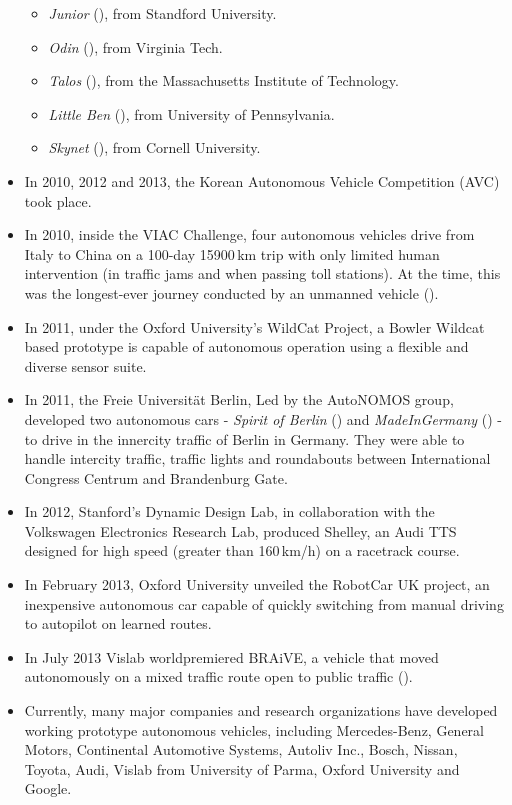 \begin{itemize}
\begin{itemize}
  \item \emph{Junior} (\cite{Montemerlo2008}), from Standford University.
  \item \emph{Odin} (\cite{Bacha2008}), from Virginia Tech.
  \item \emph{Talos} (\cite{leonard2007team}), from the Massachusetts Institute of Technology.
  \item \emph{Little Ben} (\cite{bohren2008little}), from University of Pennsylvania.
  \item \emph{Skynet} (\cite{miller2008team}), from Cornell University.
 \end{itemize}
 \item In 2010, 2012 and 2013, the Korean Autonomous Vehicle Competition (AVC) took place.
 \item In 2010, inside the VIAC Challenge, four autonomous vehicles drive from Italy to China on a 100-day 15900\,km trip with only limited human intervention (in traffic jams and when passing toll stations). At the time, this was the longest-ever journey conducted by an unmanned vehicle (\cite{Broggi2010VIAC}).
 \item In 2011, under the Oxford University's WildCat Project, a Bowler Wildcat based prototype is capable of autonomous operation using a flexible and diverse sensor suite.
 \item In 2011, the Freie Universität Berlin, Led by the AutoNOMOS group, developed two autonomous cars - \emph{Spirit of Berlin} (\cite{berlin2007spirit}) and \emph{MadeInGermany} (\cite{gohring2013semi}) - to drive in the innercity traffic of Berlin in Germany. They were able to handle intercity traffic, traffic lights and roundabouts between International Congress Centrum and Brandenburg Gate.
 \item In 2012, Stanford's Dynamic Design Lab, in collaboration with the Volkswagen Electronics Research Lab, produced Shelley, an Audi TTS designed for high speed (greater than 160\,km/h) on a racetrack course.
 \item In February 2013, Oxford University unveiled the RobotCar UK project, an inexpensive autonomous car capable of quickly switching from manual driving to autopilot on learned routes.
 \item In July 2013 Vislab worldpremiered BRAiVE, a vehicle that moved autonomously on a mixed traffic route open to public traffic (\cite{grisleri2010braive}).
 \item Currently, many major companies and research organizations have developed working prototype autonomous vehicles, including Mercedes-Benz, General Motors, Continental Automotive Systems, Autoliv Inc., Bosch, Nissan, Toyota, Audi, Vislab from University of Parma, Oxford University and Google.
\end{itemize}
 
